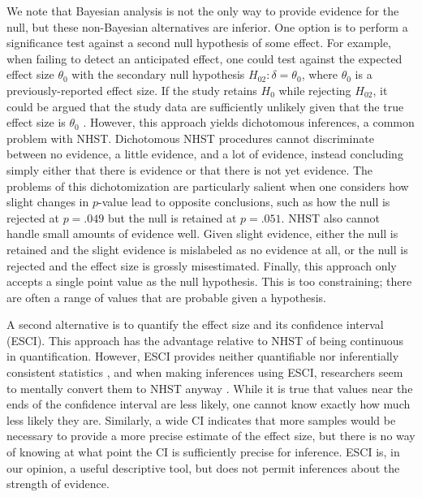 \documentclass[man]{apa6}
\begin{document}
We note that Bayesian analysis is not the only way to provide evidence for the null, but these non-Bayesian alternatives are inferior. One option is to perform a significance test against a second null hypothesis of some effect. For example, when failing to detect an anticipated effect, one could test against the expected effect size $\theta_0$ with the secondary null hypothesis $H_{02}: \delta = \theta_0$, where $\theta_0$ is a previously-reported effect size. If the study retains $H_0$ while rejecting $H_{02}$, it could be argued that the study data are sufficiently unlikely given that the true effect size is $\theta_0$ \citep[e.g.,][]{Simonsohn:etal:2014}. 
However, this approach yields dichotomous inferences, a common problem with NHST. Dichotomous NHST procedures cannot discriminate between no evidence, a little evidence, and a lot of evidence, instead concluding simply either that there is evidence or that there is not yet evidence. The problems of this dichotomization are particularly salient when one considers how slight changes in $p$-value lead to opposite conclusions, such as how the null is rejected at $p = .049$ but the null is retained at $p = .051$. NHST also cannot handle small amounts of evidence well. Given slight evidence, either the null is retained and the slight evidence is mislabeled as no evidence at all, or the null is rejected and the effect size is grossly misestimated. Finally, this approach only accepts a single point value as the null hypothesis. This is too constraining; there are often a range of values that are probable given a hypothesis.

A second alternative is to quantify the effect size and its confidence interval (ESCI). This approach has the advantage relative to NHST of being continuous in quantification.  However, ESCI provides neither quantifiable nor inferentially consistent statistics \citep[see][]{Morey:etal:2014}, and when making inferences using ESCI, researchers seem to mentally convert them to NHST anyway \citep{Hoekstra:etal:2014}. While it is true that values near the ends of the confidence interval are less likely, one cannot know exactly how much less likely they are. Similarly, a wide CI indicates that more samples would be necessary to provide a more precise estimate of the effect size, but there is no way of knowing at what point the CI is sufficiently precise for inference. ESCI is, in our opinion, a useful descriptive tool, but does not permit inferences about the strength of evidence.
\end{document}
